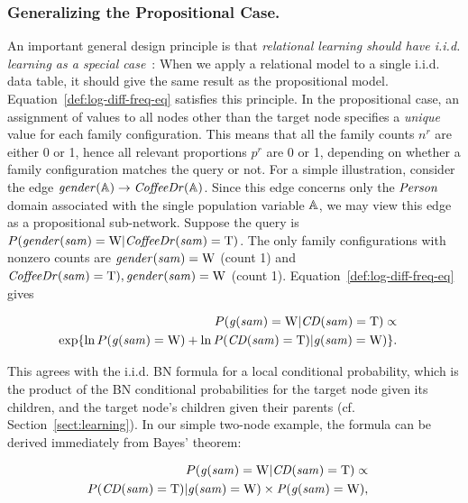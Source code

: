 \documentclass[runningheads,a4paper]{llncs}
\newcommand{\iid}{i.i.d.}
\begin{document}
\subsubsection{Generalizing the Propositional Case.} An important general design principle is that {\em relational learning should have  i.i.d. learning as a special case}~\cite{Ch.10deraedt,Knobbe2006}: When we apply a relational model to a single \iid{} data table, it should give the same result as the propositional model. Equation~\ref{def:log-diff-freq-eq} satisfies this principle. In the propositional case, an assignment of values to all nodes other than the target node specifies a {\em unique} value for each family configuration. This means that all the family counts $n^{r}$ are either 0 or 1, hence all relevant proportions $p^{r}$ are 0 or 1, depending on whether a family configuration matches the query or not. For a simple illustration, consider the edge $\it{gender}(\mathbb{A}) \rightarrow \it{CoffeeDr}(\mathbb{A})$. Since this edge concerns only the $\it{Person}$ domain associated with the single population variable $\mathbb{A}$, we may 
view this edge as a propositional sub-network.
%
Suppose the query is $P(\it{gender}(sam)= \mathrm{W}|\it{CoffeeDr}(sam)=\mathrm{T})$. The only family configurations with nonzero counts are $\it{gender}(sam)= \mathrm{W}$ (count 1) and $\it{CoffeeDr}(sam)=\mathrm{T}),\it{gender}(sam)= \mathrm{W}$ (count 1). Equation~\eqref{def:log-diff-freq-eq} gives


\begin{eqnarray*}
P(\it{g}(sam)= \mathrm{W}|\it{CD}(sam)=\mathrm{T}) \propto \\
\exp \{\ln P(\it{g}(sam)= \mathrm{W}) + \ln P(\it{CD}(sam)=\mathrm{T})|\it{g}(sam)= \mathrm{W})\}.&&
\end{eqnarray*}


This agrees with the i.i.d. BN formula for a local conditional probability, which is the product of the BN conditional probabilities for the target node given its children, and the target node's children given their parents (cf. Section~\ref{sect:learning}). 
In our simple two-node example, the formula can be derived immediately from Bayes' theorem:

\begin{eqnarray*}
P(\it{g}(sam)= \mathrm{W}|\it{CD}(sam)=\mathrm{T}) \propto \\
P(\it{CD}(sam)=\mathrm{T})|\it{g}(sam)= \mathrm{W}) \times P(\it{g}(sam)= \mathrm{W}),&&
\end{eqnarray*}
\end{document}
